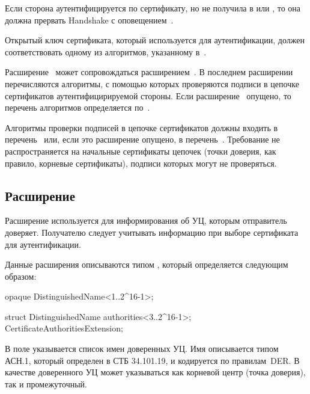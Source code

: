 Если сторона аутентифицируется по сертификату, но не получила 
 в  или 
, то она должна прервать  
Handshake с оповещением~.

Открытый ключ сертификата, который используется для аутентификации, должен 
соответствовать одному из алгоритмов, указанному 
в~. 

Расширение~ может сопровождаться 
расширением~. В последнем расширении 
перечисляются алгоритмы, с помощью которых проверяются подписи в цепочке 
сертификатов аутентифицирируемой стороны. Если 
расширение~ опущено, то перечень алгоритмов   
определяется по~. 

Алгоритмы проверки подписей в цепочке сертификатов должны входить в 
перечень~ или, если это расширение опущено,  
в перечень~. 
%
Требование не распространяется на начальные сертификаты цепочек (точки доверия, 
как правило, корневые сертификаты), подписи которых могут не проверяться.

\subsection{Расширение }\label{HS.Ext.ca} 

Расширение  используется для информирования
об УЦ, которым отправитель доверяет. Получателю следует учитывать 
информацию при выборе сертификата для аутентификации.

Данные расширения  описываются типом 
, который определяется следующим образом:

\begin{codeblock}
opaque DistinguishedName<1..2^16-1>;

struct {
  DistinguishedName authorities<3..2^16-1>;
} CertificateAuthoritiesExtension;
\end{codeblock}

В поле  указывается список имен доверенных УЦ. Имя 
описывается типом~ АСН.1, который определен в СТБ 34.101.19,
и кодируется по правилам~DER.
%
В качестве доверенного УЦ может указываться как корневой центр (точка 
доверия), так и промежуточный.

